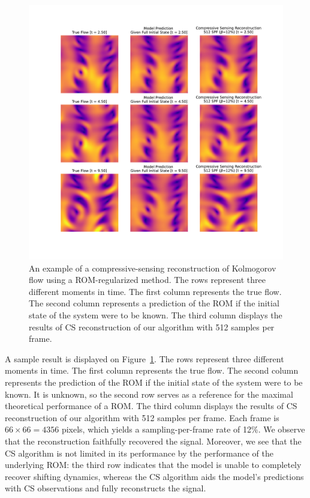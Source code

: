 \begin{figure}
	\centering
	\includegraphics[width=\textwidth]{figures/kolmogorov_example.pdf}
	\caption{\label{fig:kolmogorov_example} An example of a compressive-sensing reconstruction of Kolmogorov flow using a ROM-regularized method. The rows represent three different moments in time. The first column represents the true flow. The second column represents a prediction of the ROM if the initial state of the system were to be known. The third column displays the results of CS reconstruction of our algorithm with 512 samples per frame.}
\end{figure}

A sample result is displayed on Figure~\ref{fig:kolmogorov_example}. The rows represent three different moments in time. The first column represents the true flow. The second column represents the prediction of the ROM if the initial state of the system were to be known. It is unknown, so the second row serves as a reference for the maximal theoretical performance of a ROM. The third column displays the results of CS reconstruction of our algorithm with 512 samples per frame. Each frame is $66\times 66=4356$ pixels, which yields a sampling-per-frame rate of 12\%. We observe that the reconstruction faithfully recovered the signal. Moreover, we see that the CS algorithm is not limited in its performance by the performance of the underlying ROM: the third row indicates that the model is unable to completely recover shifting dynamics, whereas the CS algorithm aids the model's predictions with CS observations and fully reconstructs the signal.

